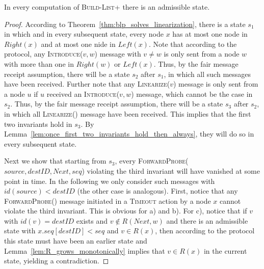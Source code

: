 \documentclass[a4paper,USenglish]{lipics}
\newcommand{\blp}{\textsc{Build-List+}\xspace}
\newcommand{\linearize}[1]{\textsc{Linearize(\ensuremath{#1})}\xspace}
\newcommand{\introduce}[1]{\textsc{Introduce(\ensuremath{#1})}\xspace}
\newcommand{\timeout}{\textsc{Timeout}\xspace}
\newcommand{\forwardprobe}[1]{\textsc{ForwardProbe(\ensuremath{#1})}\xspace}
\begin{document}
\begin{lemma}\label{lem:admissible_state_always_exists}
 In every computation of \blp there is an admissible state.
\end{lemma}

\begin{proof}
According to Theorem~\ref{thm:blp_solves_linearization}, there is a state $s_1$ in which and in every subsequent state, every node $x$ has at most one node in $Right(x)$ and at most one nide in $Left(x)$.
Note that according to the protocol, any \introduce{v,w} message with $v \neq w$ is only sent from a node $w$ with more than one in $Right(w)$ or $Left(x)$.
Thus, by the fair message receipt assumption, there will be a state $s_2$ after $s_1$, in which all such messages have been received.
Further note that any \linearize{v} message is only sent from a node $u$ if $u$ received an \introduce{v,w} message, which cannot be the case in $s_2$.
Thus, by the fair message receipt assumption, there will be a state $s_3$ after $s_2$, in which all \linearize{} message have been received.
This implies that the first two invariants hold in $s_3$.
By Lemma~\ref{lem:once_first_two_invariants_hold_then_always}, they will do so in every subsequent state.

Next we show that starting from $s_3$, every \forwardprobe{source,destID,Next,seq} violating the third invariant will have vanished at some point in time.
In the following we only consider such messages with $id(source) < destID$ (the other case is analogous).
First, notice that any \forwardprobe{} message initiated in a \timeout action by a node $x$ cannot violate the third invariant.
This is obvious for a) and b).
For c), notice that if $v$ with $id(v) = destID$ exists and $v \notin R(Next,w)$ and there is an admissible state with $x.seq[destID] < seq$ and $v \in R(x)$, then according to the protocol this state must have been an earlier state and Lemma~\ref{lem:R_grows_monotonically} implies that $v \in R(x)$ in the current state, yielding a contradiction.



\end{proof}
\end{document}
